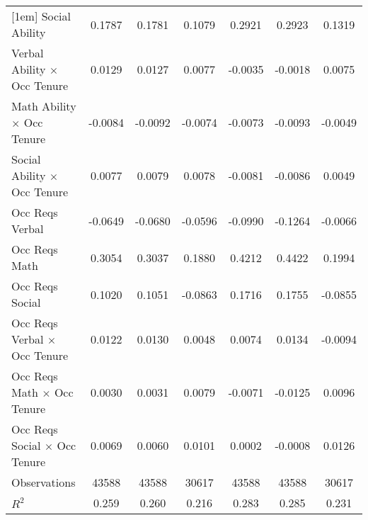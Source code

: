 {\begin{tabular}{l*{6}{c}}
[1em]
Social Ability      &      0.1787\sym{***}&      0.1781\sym{***}&      0.1079\sym{***}&      0.2921\sym{***}&      0.2923\sym{***}&      0.1319\sym{***}\\
[1em]
Verbal Ability $\times$ Occ Tenure&      0.0129\sym{***}&      0.0127\sym{**} &      0.0077         &     -0.0035         &     -0.0018         &      0.0075\sym{*}  \\
[1em]
Math Ability $\times$ Occ Tenure&     -0.0084\sym{*}  &     -0.0092\sym{*}  &     -0.0074         &     -0.0073\sym{**} &     -0.0093\sym{***}&     -0.0049         \\
[1em]
Social Ability $\times$ Occ Tenure&      0.0077\sym{**} &      0.0079\sym{**} &      0.0078\sym{**} &     -0.0081\sym{***}&     -0.0086\sym{***}&      0.0049\sym{**} \\
[1em]
Occ Reqs Verbal     &     -0.0649         &     -0.0680         &     -0.0596         &     -0.0990         &     -0.1264\sym{*}  &     -0.0066         \\
[1em]
Occ Reqs Math       &      0.3054\sym{***}&      0.3037\sym{***}&      0.1880\sym{**} &      0.4212\sym{***}&      0.4422\sym{***}&      0.1994\sym{***}\\
[1em]
Occ Reqs Social     &      0.1020\sym{***}&      0.1051\sym{***}&     -0.0863\sym{***}&      0.1716\sym{***}&      0.1755\sym{***}&     -0.0855\sym{***}\\
[1em]
Occ Reqs Verbal $\times$ Occ Tenure&      0.0122         &      0.0130         &      0.0048         &      0.0074         &      0.0134\sym{*}  &     -0.0094         \\
[1em]
Occ Reqs Math $\times$ Occ Tenure&      0.0030         &      0.0031         &      0.0079         &     -0.0071         &     -0.0125\sym{*}  &      0.0096         \\
[1em]
Occ Reqs Social $\times$ Occ Tenure&      0.0069\sym{*}  &      0.0060         &      0.0101\sym{**} &      0.0002         &     -0.0008         &      0.0126\sym{***}\\
\hline  
Observations        &       43588         &       43588         &       30617         &       43588         &       43588         &       30617         \\
\(R^{2}\)           &       0.259         &       0.260         &       0.216         &       0.283         &       0.285         &       0.231         \\
\hline  
\end{tabular}
}

